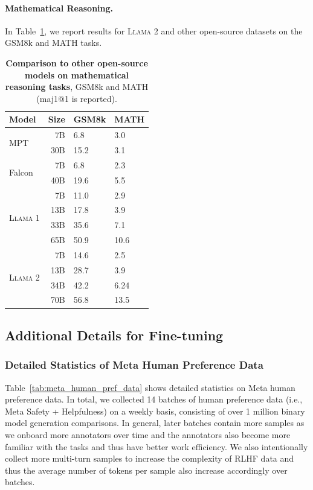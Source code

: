 \documentclass{article}
\newcommand{\anise}{\textsc{Llama 1}\xspace}
\newcommand{\cinnamon}{\textsc{Llama 2}\xspace}
\begin{document}
\paragraph{Mathematical Reasoning.} In Table~\ref{tab:math}, we report results for \cinnamon and other open-source datasets on the GSM8k and MATH tasks.
\begin{table}[]
\centering
\begin{tabular}{@{}lrll@{}}
\toprule
Model & Size & GSM8k & MATH \\ \midrule
\multirow{2}{*}{MPT} & 7B & 6.8 & 3.0 \\
 & 30B & 15.2 & 3.1 \\ \midrule
\multirow{2}{*}{Falcon} & 7B & 6.8 & 2.3 \\
 & 40B & 19.6 & 5.5 \\ \midrule
\multirow{4}{*}{\anise} & 7B & 11.0 & 2.9 \\
 & 13B & 17.8 & 3.9 \\
 & 33B & 35.6 & 7.1 \\
 & 65B & 50.9 & 10.6 \\ \midrule
\multirow{4}{*}{\cinnamon} & 7B & 14.6 & 2.5 \\
 & 13B & 28.7 & 3.9 \\
 & 34B & 42.2 & 6.24 \\
 & 70B & 56.8 & 13.5 \\ \bottomrule
\end{tabular}
\caption{\textbf{Comparison to other open-source models on mathematical reasoning tasks}, GSM8k and MATH (maj1@1 is reported).  }
\label{tab:math}
\end{table}

\subsection{Additional Details for Fine-tuning}
\subsubsection{Detailed Statistics of Meta Human Preference Data}
\label{sec:meta_human_pref_data_stats}

Table~\ref{tab:meta_human_pref_data} shows detailed statistics on Meta human preference data. In total, we collected 14 batches of human preference data (i.e., Meta Safety + Helpfulness) on a weekly basis, consisting of over 1 million binary model generation comparisons. In general, later batches contain more samples as we onboard more annotators over time and the annotators also become more familiar with the tasks and thus have better work efficiency. We also intentionally collect more multi-turn samples to increase the complexity of RLHF data and thus the average number of tokens per sample also increase accordingly over batches. 
\end{document}
